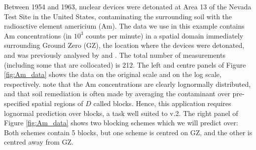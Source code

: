 \documentclass[article]{jss}
\begin{document}
Between 1954 and 1963, nuclear devices were detonated at Area 13 of the Nevada Test Site in the United States, contaminating the surrounding soil with the radioactive element americium (Am). 
The data we use in this example contains 
 Am concentrations (in $10^3$ counts per minute) in a spatial domain immediately surrounding Ground Zero (GZ), the location where the devices were detonated, and was previously analysed by \cite{Huang_2009_multivar_intrinsic_rand_functions_cokriging} and \cite{Paul_Cressie_2011_lognormal_kriging_block_prediction}. 
The total number of measurements (including some that are collocated) is 212.
The left and centre panels of Figure \ref{fig:Am_data} shows the data on the original scale and on the log scale, respectively.
\cite{Paul_Cressie_2011_lognormal_kriging_block_prediction} note that the Am concentrations are clearly lognormally distributed, and that soil remediation is often made by averaging the contaminant over pre-specified spatial regions of $D$ called blocks.
Hence, %
 this application requires lognormal prediction over blocks, a task well suited to  v.2. %
 The right panel of Figure \ref{fig:Am_data} shows two blocking schemes which we will predict over: Both schemes contain 5 blocks, but one scheme is centred on GZ, and the other is centred away from GZ.
\end{document}
